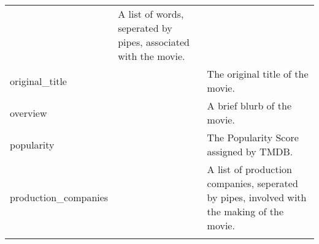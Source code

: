 \documentclass[11pt]{article}
\begin{document}
\begin{longtable}[]{@{}lll@{}}
\begin{minipage}[t]{0.05\columnwidth}
\strut
\end{minipage} & \begin{minipage}[t]{0.28\columnwidth}\raggedright\strut
A list of words, seperated by pipes, associated with the movie.\strut
\end{minipage}\tabularnewline
\begin{minipage}[t]{0.28\columnwidth}\raggedright\strut
original\_title\strut
\end{minipage} & \begin{minipage}[t]{0.05\columnwidth}\raggedright\strut
\strut
\end{minipage} & \begin{minipage}[t]{0.28\columnwidth}\raggedright\strut
The original title of the movie.\strut
\end{minipage}\tabularnewline
\begin{minipage}[t]{0.28\columnwidth}\raggedright\strut
overview\strut
\end{minipage} & \begin{minipage}[t]{0.05\columnwidth}\raggedright\strut
\strut
\end{minipage} & \begin{minipage}[t]{0.28\columnwidth}\raggedright\strut
A brief blurb of the movie.\strut
\end{minipage}\tabularnewline
\begin{minipage}[t]{0.28\columnwidth}\raggedright\strut
popularity\strut
\end{minipage} & \begin{minipage}[t]{0.05\columnwidth}\raggedright\strut
\strut
\end{minipage} & \begin{minipage}[t]{0.28\columnwidth}\raggedright\strut
The Popularity Score assigned by TMDB.\strut
\end{minipage}\tabularnewline
\begin{minipage}[t]{0.28\columnwidth}\raggedright\strut
production\_companies\strut
\end{minipage} & \begin{minipage}[t]{0.05\columnwidth}\raggedright\strut
\strut
\end{minipage} & \begin{minipage}[t]{0.28\columnwidth}\raggedright\strut
A list of production companies, seperated by pipes, involved with the
making of the movie.\strut
\end{minipage}\tabularnewline
\begin{minipage}[t]{0.28\columnwidth}\raggedright\strut

\end{minipage}
\end{longtable}
\end{document}
